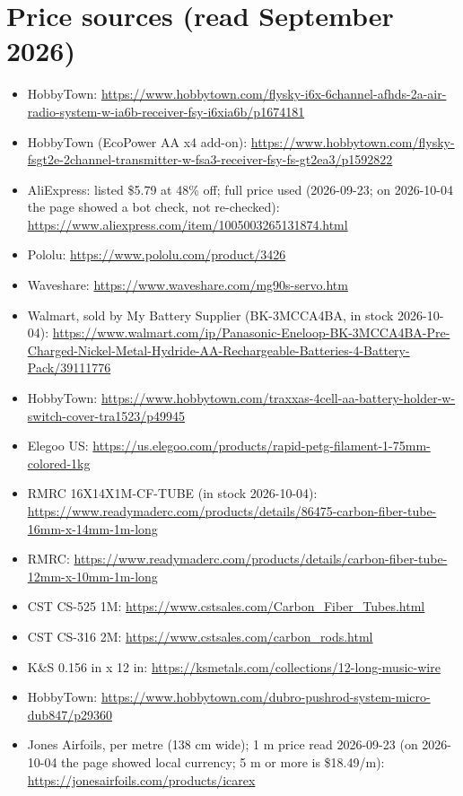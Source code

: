 \documentclass[11pt]{article}
\begin{document}
\section*{Price sources (read September 2026)}
{\small\begin{itemize}
\item HobbyTown: \url{https://www.hobbytown.com/flysky-i6x-6channel-afhds-2a-air-radio-system-w-ia6b-receiver-fsy-i6xia6b/p1674181}
\item HobbyTown (EcoPower AA x4 add-on): \url{https://www.hobbytown.com/flysky-fsgt2e-2channel-transmitter-w-fsa3-receiver-fsy-fs-gt2ea3/p1592822}
\item AliExpress: listed \$5.79 at 48\% off; full price used (2026-09-23; on 2026-10-04 the page showed a bot check, not re-checked): \url{https://www.aliexpress.com/item/1005003265131874.html}
\item Pololu: \url{https://www.pololu.com/product/3426}
\item Waveshare: \url{https://www.waveshare.com/mg90s-servo.htm}
\item Walmart, sold by My Battery Supplier (BK-3MCCA4BA, in stock 2026-10-04): \url{https://www.walmart.com/ip/Panasonic-Eneloop-BK-3MCCA4BA-Pre-Charged-Nickel-Metal-Hydride-AA-Rechargeable-Batteries-4-Battery-Pack/39111776}
\item HobbyTown: \url{https://www.hobbytown.com/traxxas-4cell-aa-battery-holder-w-switch-cover-tra1523/p49945}
\item Elegoo US: \url{https://us.elegoo.com/products/rapid-petg-filament-1-75mm-colored-1kg}
\item RMRC 16X14X1M-CF-TUBE (in stock 2026-10-04): \url{https://www.readymaderc.com/products/details/86475-carbon-fiber-tube-16mm-x-14mm-1m-long}
\item RMRC: \url{https://www.readymaderc.com/products/details/carbon-fiber-tube-12mm-x-10mm-1m-long}
\item CST CS-525 1M: \url{https://www.cstsales.com/Carbon_Fiber_Tubes.html}
\item CST CS-316 2M: \url{https://www.cstsales.com/carbon_rods.html}
\item K\&S 0.156 in x 12 in: \url{https://ksmetals.com/collections/12-long-music-wire}
\item HobbyTown: \url{https://www.hobbytown.com/dubro-pushrod-system-micro-dub847/p29360}
\item Jones Airfoils, per metre (138 cm wide); 1 m price read 2026-09-23 (on 2026-10-04 the page showed local currency; 5 m or more is \$18.49/m): \url{https://jonesairfoils.com/products/icarex}

\end{itemize}}
\end{document}
